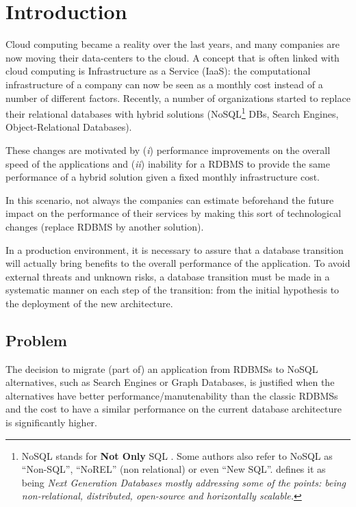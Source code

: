 \chapter{Introduction}\label{introductionChap}

Cloud computing became a reality over the last years, and many companies are now moving their data-centers to the cloud. 
A concept that is often linked with cloud computing is Infrastructure as a Service (IaaS): the computational infrastructure of a company can now be seen as a monthly cost instead of a number of different factors. 
Recently, a number of organizations started to replace their relational databases with hybrid solutions (NoSQL\footnote{ NoSQL stands for  \textbf{Not Only} SQL \cite{7023585}. Some authors also refer to NoSQL as ``Non-SQL'', ``NoREL'' (non relational) or even ``New SQL''. \cite{NOSQLDB} defines it as being \textit{
Next Generation Databases mostly addressing some of the points: being non-relational, distributed, open-source and horizontally scalable.}} DBs, Search Engines, Object-Relational Databases). 

These changes are motivated by (\textit{i}) performance improvements on the overall speed of the applications and (\textit{ii}) inability for a RDBMS to provide the same performance of a hybrid solution given a fixed monthly infrastructure cost.

In this scenario, not always the companies can estimate beforehand the future impact on the performance of their services by making this sort of technological changes (replace RDBMS by another solution).

In a production environment, it is necessary to assure that a database transition will actually bring benefits to the overall performance of the application. To avoid external threats and unknown risks, a database transition must be made in a systematic manner on each step of the transition: from the initial hypothesis to the deployment of the new architecture.


\section{Problem}

The decision to migrate (part of) an application from RDBMSs to NoSQL alternatives, such as Search Engines or Graph Databases, is justified when the alternatives have better performance/manutenability than the classic RDBMSs and the cost to have a similar performance on the current database architecture is significantly higher. 

